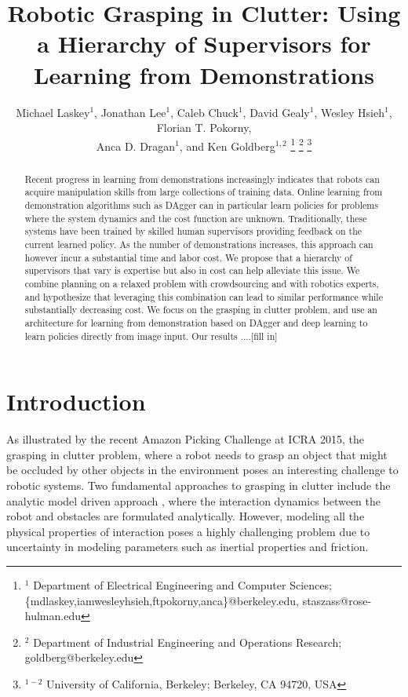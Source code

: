 \documentclass[10pt, conference]{ieeeconf}      %
\title{Robotic Grasping in Clutter: Using a Hierarchy of Supervisors for \adnote{(Deep)} Learning from Demonstrations\adnote{I would remove deep but if you really want to keep it put it in parens? deep is not central to this and it pigeonholes you}}
\author{Michael Laskey$^1$, Jonathan Lee$^1$, Caleb Chuck$^1$, David Gealy$^1$, Wesley Hsieh$^1$, Florian T. Pokorny,\\
 Anca D. Dragan$^1$, and Ken Goldberg$^{1,2}$%
\thanks{$^1$ Department of Electrical Engineering and Computer Sciences; {\small \{mdlaskey,iamwesleyhsieh,ftpokorny,anca\}@berkeley.edu, \small staszass@rose-hulman.edu} }%
\thanks{$^2$ Department of Industrial Engineering and Operations Research; {\small goldberg@berkeley.edu}}%
\thanks{$^{1-2}$ University of California, Berkeley;  Berkeley, CA 94720, USA}%
}
\begin{document}
\maketitle
\thispagestyle{empty}
\pagestyle{empty}



\begin{abstract}
Recent progress in learning from demonstrations increasingly indicates that robots can acquire manipulation skills from
large collections of training data. Online learning from demonstration algorithms such as DAgger can in particular learn
policies for problems where the system dynamics and the cost function are unknown. Traditionally, these systems have
been trained by skilled human supervisors providing feedback on the current learned policy. As the number of
demonstrations increases, this approach can however incur a substantial time and labor cost. We propose that a hierarchy of supervisors that vary is expertise but also in cost can help alleviate this issue. We combine planning on a relaxed problem with crowdsourcing and with robotics experts, and hypothesize that leveraging this combination can lead to similar performance while substantially decreasing cost. We focus on the grasping in clutter problem, and use an architecture for learning from demonstration based on DAgger and deep learning to learn policies directly from image input. Our results ....[fill in]

 \end{abstract}



\section{Introduction} 
As illustrated by the recent Amazon Picking Challenge at ICRA 2015, the grasping in clutter problem, where a robot needs
to grasp an object that might be occluded by other objects in the environment poses an interesting challenge to robotic
systems. Two fundamental approaches to grasping in clutter include the analytic model driven approach \cite{1,2,3},
where the interaction dynamics between the robot and obstacles are formulated analytically. However, modeling all the 
physical properties of interaction poses a highly challenging problem due to uncertainty in modeling parameters such as
inertial properties and friction. 
\end{document}
